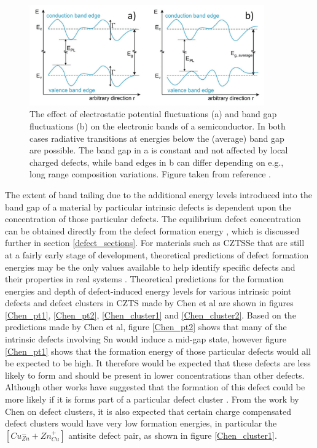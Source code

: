 \begin{figure}[h!]
  \centering
    \includegraphics[width=0.9\textwidth]{figures/band_tail_fig.png}
    \caption{The effect of electrostatic potential fluctuations (a) and band gap fluctuations (b) on the electronic bands of a semiconductor. In both cases radiative transitions at energies below the (average) band gap are possible. The band gap in a is constant and not affected by local charged defects, while band edges in b can differ depending on e.g., long range composition variations. Figure taken from reference .}
  \label{band_tail_fig}
\end{figure}

The extent of band tailing due to the additional energy levels introduced into the band gap of a material by particular intrinsic defects is dependent upon the concentration of those particular defects. The equilibrium defect concentration can be obtained directly from the defect formation energy \cite{DFT_in_mat}, which is discussed further in section \ref{defect_sections}. For materials such as CZTSSe that are still at a fairly early stage of development, theoretical predictions of defect formation energies may be the only values available to help identify specific defects and their properties in real systems \cite{kosyak}. Theoretical predictions for the formation energies and depth of defect-induced energy levels for various intrinsic point defects and defect clusters in CZTS made by Chen et al \cite{defect1} are shown in figures \ref{Chen_pt1}, \ref{Chen_pt2}, \ref{Chen_cluster1} and \ref{Chen_cluster2}. Based on the predictions made by Chen et al, figure \ref{Chen_pt2} shows that many of the intrinsic defects involving Sn would induce a mid-gap state, however figure \ref{Chen_pt1} shows that the formation energy of those particular defects would all be expected to be high. It therefore would be expected that these defects are less likely to form and should be present in lower concentrations than other defects. Although other works have suggested that the formation of this defect could be more likely if it is forms part of a particular defect cluster \cite{CZTS_n-type, culprit}. From the work by Chen on defect clusters, it is also expected that certain charge compensated defect clusters would have very low formation energies, in particular the $[Cu_{Zn}^{-} + Zn_{Cu}^{+}]$ antisite defect pair, as shown in figure \ref{Chen_cluster1}.\\

